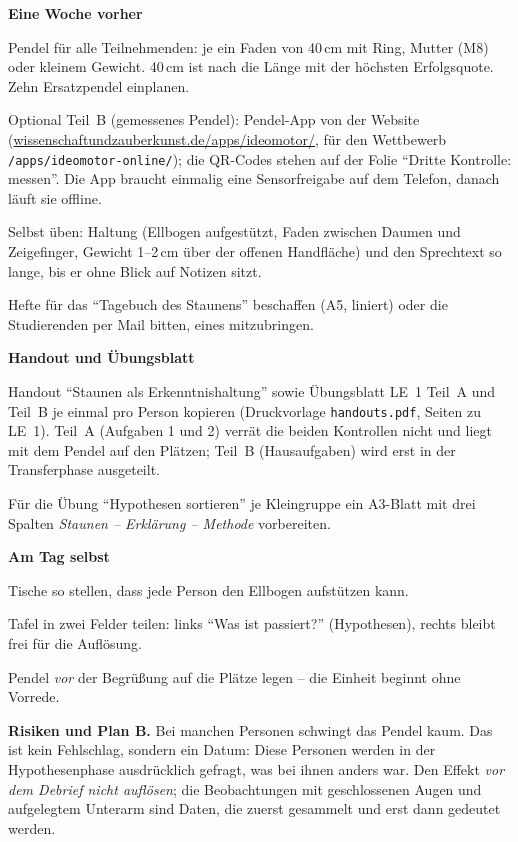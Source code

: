 \begin{vorbereitung}
\textbf{Eine Woche vorher}
\begin{checkliste}
  \item Pendel für alle Teilnehmenden: je ein Faden von 40\,cm mit Ring,
    Mutter (M8) oder kleinem Gewicht. 40\,cm ist nach
    \textcite{cantergi2021chevreul} die Länge mit der höchsten
    Erfolgsquote. Zehn Ersatzpendel einplanen.
  \item Optional Teil~B (gemessenes Pendel): Pendel-App von der
    Website (\url{wissenschaftundzauberkunst.de/apps/ideomotor/}, für den
    Wettbewerb \texttt{/apps/ideomotor-online/}); die QR-Codes stehen auf
    der Folie \enquote{Dritte Kontrolle: messen}. Die App braucht einmalig
    eine Sensorfreigabe auf dem Telefon, danach läuft sie offline.
  \item Selbst üben: Haltung (Ellbogen aufgestützt, Faden zwischen Daumen
    und Zeigefinger, Gewicht 1--2\,cm über der offenen Handfläche) und den
    Sprechtext so lange, bis er ohne Blick auf Notizen sitzt.
  \item Hefte für das \enquote{Tagebuch des Staunens} beschaffen (A5,
    liniert) oder die Studierenden per Mail bitten, eines mitzubringen.
\end{checkliste}

\textbf{Handout und Übungsblatt}
\begin{checkliste}
  \item Handout \enquote{Staunen als Erkenntnishaltung} sowie Übungsblatt
    LE~1 Teil~A und Teil~B je einmal pro Person kopieren (Druckvorlage
    \texttt{handouts.pdf}, Seiten zu LE~1). Teil~A (Aufgaben 1 und 2)
    verrät die beiden Kontrollen nicht und liegt mit dem Pendel auf den
    Plätzen; Teil~B (Hausaufgaben) wird erst in der Transferphase
    ausgeteilt.
  \item Für die Übung \enquote{Hypothesen sortieren} je Kleingruppe ein
    A3-Blatt mit drei Spalten \emph{Staunen -- Erklärung -- Methode}
    vorbereiten.
\end{checkliste}

\textbf{Am Tag selbst}
\begin{checkliste}
  \item Tische so stellen, dass jede Person den Ellbogen aufstützen kann.
  \item Tafel in zwei Felder teilen: links \enquote{Was ist passiert?}
    (Hypothesen), rechts bleibt frei für die Auflösung.
  \item Pendel \emph{vor} der Begrüßung auf die Plätze legen -- die
    Einheit beginnt ohne Vorrede.
\end{checkliste}

\textbf{Risiken und Plan B.} Bei manchen Personen schwingt
das Pendel kaum. Das ist kein Fehlschlag, sondern ein Datum: Diese Personen
werden in der Hypothesenphase ausdrücklich gefragt, was bei ihnen anders
war. Den Effekt \emph{vor dem Debrief nicht auflösen}; die Beobachtungen mit
geschlossenen Augen und aufgelegtem Unterarm sind Daten, die zuerst
gesammelt und erst dann gedeutet werden.
\end{vorbereitung}

